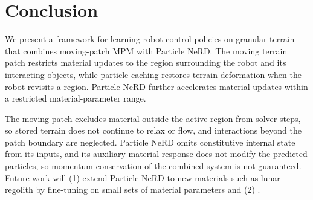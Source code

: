 \section{Conclusion}
We present a framework for learning robot control policies on granular terrain that combines moving-patch MPM with Particle NeRD.
The moving terrain patch restricts material updates to the region surrounding the robot and its interacting objects, while particle caching restores terrain deformation when the robot revisits a region.
Particle NeRD further accelerates material updates within a restricted material-parameter range.

The moving patch excludes material outside the active region from solver steps, so stored terrain does not continue to relax or flow, and interactions beyond the patch boundary are neglected.
Particle NeRD omits constitutive internal state from its inputs, and its auxiliary material response does not modify the predicted particles, so momentum conservation of the combined system is not guaranteed.
Future work will (1) extend Particle NeRD to new materials such as lunar regolith by fine-tuning on small sets of material parameters and (2) .
